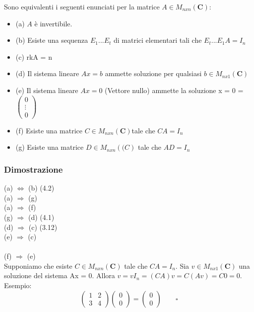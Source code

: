 \documentclass[12pt]{article}
\begin{document}
Sono equivalenti i seguenti enunciati per la matrice $A \in M_{nxn} (\mathbf{C}):$
\begin{itemize}
    \item (a) $A$ è invertibile.
    \item (b) Esiste una sequenza $E_1 ... E_t$ di matrici elementari tali che $E_t ... E_1A = I_n$
    \item (c) rkA = n
    \item (d) Il sistema lineare $Ax = b$ ammette soluzione per qualsiasi $b \in M_{nx1} (\mathbf{C})$
    \item (e) Il sistema lineare $Ax = 0$ (Vettore nullo) ammette la soluzione x = 0 = $\begin{pmatrix}
        0\\
        \vdots\\
        0
    \end{pmatrix}$
    \item (f) Esiste una matrice $C \in M_{nxn} (\mathbf{C}) $tale che $CA = I_n$
    \item (g) Esiste una matrice $D \in M_{nxn} (\mathbf({C})$ tale che $AD = I_n$
\end{itemize}

\subsubsection{Dimostrazione}

(a) $\Longleftrightarrow$ (b) (4.2)\\
(a) $\Longrightarrow$ (g)\\
(a) $\Rightarrow$ (f)\\
(g) $\Longrightarrow$ (d) (4.1)\\
(d) $\Longrightarrow$ (c) (3.12)\\
(e) $\Longrightarrow$ (c)\\\\
(f) $\Longrightarrow$ (e)\\
Supponiamo che esiste $C \in M_{nxn} (\mathbf{C})$ tale che $CA = I_n$. Sia $v \in M_{nx1} (\mathbf{C})$ una soluzione del sistema Ax = 0. Allora $v = vI_n = (CA)v = C(Av) = C0 = 0$.\\
Esempio:
\[\begin{pmatrix}
    1 & 2\\
    3 & 4
\end{pmatrix}
\begin{pmatrix}
    0\\
    0
\end{pmatrix} =
\begin{pmatrix}
    0\\
    0
\end{pmatrix}
\quad \quad \square\]
\end{document}
